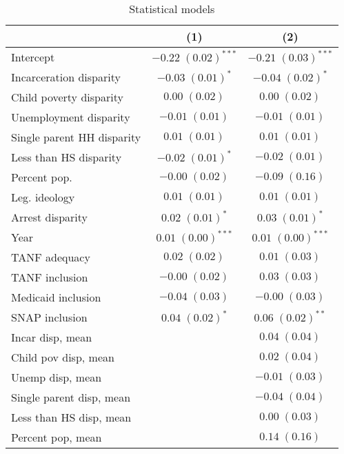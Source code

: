 
\begin{table}
\caption{Statistical models}
\begin{center}
\begin{tabular}{l c c }
\hline
 & (1) & (2) \\
\hline
Intercept                  & $-0.22 \; (0.02)^{***}$ & $-0.21 \; (0.03)^{***}$ \\
Incarceration disparity    & $-0.03 \; (0.01)^{*}$   & $-0.04 \; (0.02)^{*}$   \\
Child poverty disparity    & $0.00 \; (0.02)$        & $0.00 \; (0.02)$        \\
Unemployment disparity     & $-0.01 \; (0.01)$       & $-0.01 \; (0.01)$       \\
Single parent HH disparity & $0.01 \; (0.01)$        & $0.01 \; (0.01)$        \\
Less than HS disparity     & $-0.02 \; (0.01)^{*}$   & $-0.02 \; (0.01)$       \\
Percent pop.               & $-0.00 \; (0.02)$       & $-0.09 \; (0.16)$       \\
Leg. ideology              & $0.01 \; (0.01)$        & $0.01 \; (0.01)$        \\
Arrest disparity           & $0.02 \; (0.01)^{*}$    & $0.03 \; (0.01)^{*}$    \\
Year                       & $0.01 \; (0.00)^{***}$  & $0.01 \; (0.00)^{***}$  \\
TANF adequacy              & $0.02 \; (0.02)$        & $0.01 \; (0.03)$        \\
TANF inclusion             & $-0.00 \; (0.02)$       & $0.03 \; (0.03)$        \\
Medicaid inclusion         & $-0.04 \; (0.03)$       & $-0.00 \; (0.03)$       \\
SNAP inclusion             & $0.04 \; (0.02)^{*}$    & $0.06 \; (0.02)^{**}$   \\
Incar disp, mean           &                         & $0.04 \; (0.04)$        \\
Child pov disp, mean       &                         & $0.02 \; (0.04)$        \\
Unemp disp, mean           &                         & $-0.01 \; (0.03)$       \\
Single parent disp, mean   &                         & $-0.04 \; (0.04)$       \\
Less than HS disp, mean    &                         & $0.00 \; (0.03)$        \\
Percent pop, mean          &                         & $0.14 \; (0.16)$        \\

\end{tabular}
\end{center}
\end{table}
